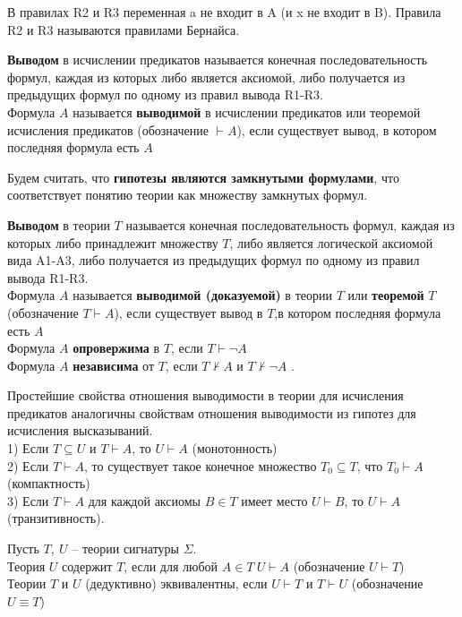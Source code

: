 В правилах R2 и R3 переменная a не входит в A (и x не входит в B). Правила R2 и R3 называются правилами Бернайса.
\begin{definition}
	\textbf{Выводом} в исчислении предикатов называется конечная
	последовательность формул, каждая из которых либо является аксиомой, либо получается из предыдущих формул по
	одному из правил вывода R1-R3.\\
	Формула $A$ называется \textbf{выводимой} в исчислении предикатов или теоремой исчисления предикатов
	(обозначение $\vdash A$), если существует вывод, в котором последняя формула есть $A$ \label{formula9}
\end{definition}
Будем считать, что \textbf{гипотезы являются замкнутыми формулами}, что соответствует понятию теории как множеству
замкнутых формул.
\begin{definition}
	\textbf{Выводом} в теории $T$ называется конечная последовательность формул, каждая из которых либо принадлежит
	множеству $T$, либо является логической аксиомой вида A1-A3, либо получается из предыдущих формул по одному из
	правил вывода R1-R3.\\
	Формула $A$ называется \textbf{выводимой (доказуемой)} в теории $T$ или \textbf{теоремой} $T$ (обозначение $T
	\vdash A$), если существует вывод в $T$,в котором последняя формула есть $A$ \label{formula10} \\ 
	Формула $A$ \textbf{опровержима} в $T$, если $T \vdash \neg A$\\
	Формула $A$ \textbf{независима} от $T$, если $T \nvdash A$ и $T \nvdash \neg A$ .
\end{definition}
Простейшие свойства отношения выводимости в теории для исчисления предикатов аналогичны свойствам отношения
выводимости из гипотез для исчисления высказываний.\\
1) Если $T \subseteq U$ и $T \vdash A$, то $U \vdash A$ (монотонность)\\
2) Если $T \vdash A$, то существует такое конечное множество $T_0 \subseteq T$, что $T_0 \vdash A$ (компактность)\\
3) Если $T \vdash A$ для каждой аксиомы $B \in T$ имеет место $U \vdash B$, то $U \vdash A$ (транзитивность).
\begin{definition}
	Пусть $T, \ U$ -- теории сигнатуры $\Sigma$.\\
	Теория $U$ содержит $T$, если для любой $A\in T\: U \vdash A$ (обозначение $U \vdash T$)\\
	Теории $T$ и $U$ (дедуктивно) эквивалентны, если   $U \vdash T$ и $T \vdash U$ (обозначение $U \equiv T$)
\end{definition}
